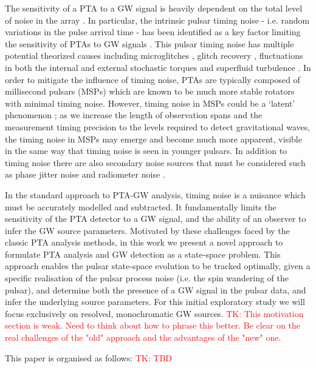 \documentclass[fleqn,usenatbib,useAMS]{mnras}
\begin{document}
\noindent The sensitivity of a PTA to a GW signal is heavily dependent on the total level of noise in the array \citep{Wang2015}. In particular, the intrinsic pulsar timing noise - i.e.  random variations in the pulse arrival time - has been identified as a key factor limiting the sensitivity of PTAs to GW signals \citep{Shannon2010,Lasky2015,Caballero2016}. This pulsar timing noise has multiple potential theorized causes including microglitches \citep{Melatos2008}, glitch recovery \citep{Hobbs2010glitch}, fluctuations in both the internal and external stochastic torques \citep{Antonelli2023} and superfluid turbulence \citep{Melatos2014}. In order to mitigate the influence of timing noise, PTAs are typically composed of millisecond pulsars (MSPs) which are known to be much more stable rotators with minimal timing noise. However, timing noise in MSPs could be a `latent' phenomenon \citep{Shannon2010}; as we increase the length of observation spans and the measurement timing precision to the levels required to detect gravitational waves, the timing noise in MSPs may emerge and become much more apparent, visible in the same way that timing noise is seen in younger pulsars. In addition to timing noise there are also secondary noise sources that must be considered such as phase jitter noise and radiometer noise \citep{Cordes2010,Lam2019,Parthasarathy2021}. \newline 


\noindent In the standard approach to PTA-GW analysis, timing noise is a nuisance which must be accurately modelled and subtracted. It fundamentally limits the sensitivity of the PTA detector to a GW signal, and the ability of an observer to infer the GW source parameters. Motivated by these challenges faced by the classic PTA analysis methods, in this work we present a novel approach to formulate PTA analysis and GW detection as a state-space problem. This approach enables the pulsar state-space evolution to be tracked optimally, given a specific realisation of the pulsar process noise (i.e. the spin wandering of the pulsar), and determine both the presence of a GW signal in the pulsar data, and  infer the underlying source parameters. For this initial exploratory study we will focus exclusively on resolved, monochromatic GW sources. \textcolor{red}{TK: This motivation section is weak. Need to think about how to phrase this better. Be clear on the real challenges of the "old" approach and the advantages of the "new" one.} \newline 


\noindent This paper is organised as follows:  \textcolor{red}{TK: TBD} \newline 
\end{document}
